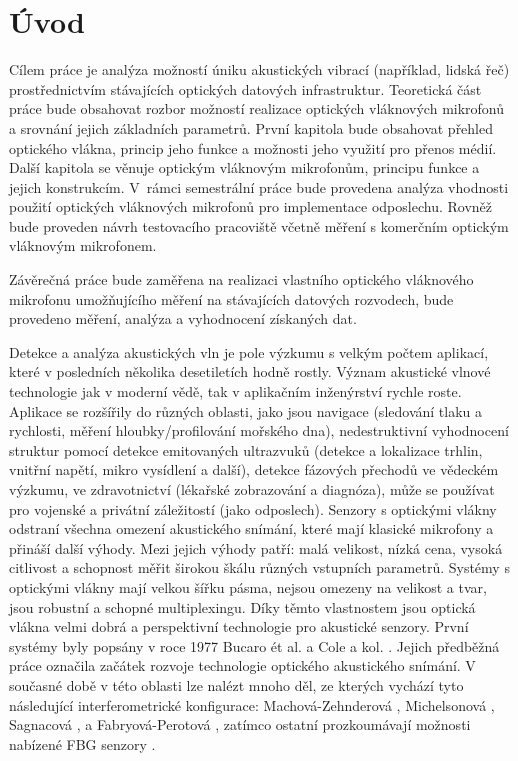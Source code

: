 \chapter*{Úvod}
{}

Cílem práce je analýza možností úniku akustických vibrací (například, lidská řeč) prostřednictvím stávajících optických datových infrastruktur. 
Teoretická část práce bude obsahovat rozbor možností realizace optických vláknových mikrofonů a srovnání jejich základních parametrů. První kapitola bude obsahovat přehled optického vlákna, princip jeho funkce a možnosti jeho využití pro přenos médií. 
Další kapitola se věnuje optickým vláknovým mikrofonům, principu funkce a jejich konstrukcím. V~rámci semestrální práce bude provedena analýza vhodnosti použití optických vláknových mikrofonů pro implementace odposlechu. Rovněž bude proveden návrh testovacího pracoviště včetně měření s komerčním optickým vláknovým mikrofonem.

Závěrečná práce bude zaměřena na realizaci vlastního optického vláknového mikrofonu umožňujícího měření na stávajících datových rozvodech, bude provedeno měření, analýza a vyhodnocení získaných dat.

Detekce a analýza akustických vln je pole výzkumu s velkým počtem aplikací, které v posledních několika desetiletích hodně rostly. Význam akustické vlnové technologie jak v moderní vědě, tak v aplikačním inženýrství rychle roste. Aplikace se rozšířily do různých oblasti, jako jsou navigace (sledování tlaku a rychlosti, měření hloubky/profilování mořského dna), nedestruktivní vyhodnocení struktur pomocí detekce emitovaných ultrazvuků (detekce a lokalizace trhlin, vnitřní napětí, mikro vysídlení a další), detekce fázových přechodů ve vědeckém výzkumu, ve zdravotnictví (lékařské zobrazování a diagnóza), může se používat pro vojenské a privátní záležitostí (jako odposlech). Senzory s optickými vlákny odstraní všechna omezení akustického snímání, které mají klasické mikrofony a přináší další výhody. Mezi jejich výhody patří: malá velikost, nízká cena, vysoká citlivost a schopnost měřit širokou škálu různých vstupních parametrů. Systémy s optickými vlákny mají velkou šířku pásma, nejsou omezeny na velikost a tvar, jsou robustní a schopné multiplexingu. Díky těmto vlastnostem jsou optická vlákna velmi dobrá a perspektivní technologie pro akustické senzory. První systémy byly popsány v roce 1977 Bucaro ét al. a Cole a kol. \cite{21, 23}. Jejich předběžná práce označila začátek rozvoje technologie optického akustického snímání. V současné době v této oblasti lze nalézt mnoho děl, ze kterých vychází tyto následující interferometrické konfigurace: Machová-Zehnderová \cite{24}, Michelsonová \cite{25}, Sagnacová \cite{26}, a Fabryová-Perotová \cite{27}, zatímco ostatní prozkoumávají možnosti nabízené FBG senzory \cite{28}.

